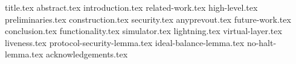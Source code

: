 \documentclass{llncs}
\begin{document}
\pagestyle{plain}


{title.tex}
{abstract.tex}
{introduction.tex}
{related-work.tex}
{high-level.tex}
{preliminaries.tex}
{construction.tex}
{security.tex}
{anyprevout.tex}
{future-work.tex}
{conclusion.tex}
{functionality.tex}
{simulator.tex}
{lightning.tex}
{virtual-layer.tex}
{liveness.tex}
{protocol-security-lemma.tex}
{ideal-balance-lemma.tex}
{no-halt-lemma.tex}
{acknowledgements.tex}


\end{document}

